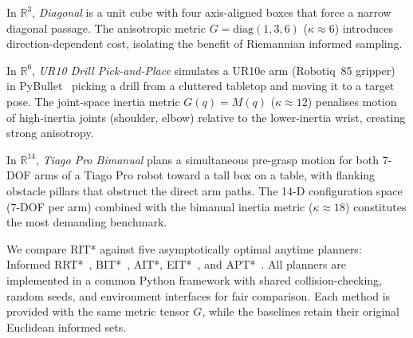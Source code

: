 \documentclass[journal]{IEEEtran}
\begin{document}
In $\mathbb{R}^{3}$, \emph{Diagonal} is a unit cube with four
axis-aligned boxes that force a narrow diagonal passage.
The anisotropic metric $G=\mathrm{diag}(1,3,6)$ ($\kappa\!\approx\!6$)
introduces direction-dependent cost, isolating the benefit of
Riemannian informed sampling.

In $\mathbb{R}^{6}$, \emph{UR10 Drill Pick-and-Place} simulates a
UR10e arm (Robotiq~85 gripper) in PyBullet~\cite{Coumans2021}
picking a drill from a cluttered tabletop and moving it to a target
pose. The joint-space inertia metric $G(q)=M(q)$ ($\kappa\!\approx\!12$)
penalises motion of high-inertia joints (shoulder, elbow) relative to
the lower-inertia wrist, creating strong anisotropy.

In $\mathbb{R}^{14}$, \emph{Tiago Pro Bimanual} plans a simultaneous
pre-grasp motion for both 7-DOF arms of a Tiago Pro robot toward a
tall box on a table, with flanking obstacle pillars that obstruct the
direct arm paths. The 14-D configuration space (7-DOF per arm)
combined with the bimanual inertia metric ($\kappa\!\approx\!18$)
constitutes the most demanding benchmark.

\begin{table}[t]
\centering
\caption{Experimental environment summary.
$d$: dimension; $\kappa$: metric condition number;
$N_{\mathrm{obs}}$: obstacles; $\ell_{\max}$: max edge length;
$n_c$: collision checks per edge.}
\label{tab:environments}
\setlength{\tabcolsep}{3pt}
\end{table}


We compare RIT* against five asymptotically optimal anytime
planners: Informed RRT*~\cite{Gammell2018},
BIT*~\cite{Gammell2020}, AIT*, EIT*~\cite{Strub2022},
and APT*~\cite{APT2025}.
All planners are implemented in a common Python framework
with shared collision-checking, random seeds, and environment
interfaces for fair comparison. Each method is provided with
the same metric tensor $G$, while the baselines retain their
original Euclidean informed sets.
\end{document}
